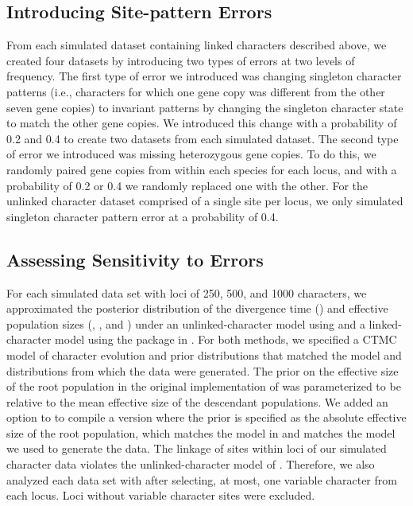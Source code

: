 \subsection{Introducing Site-pattern Errors}
From each simulated dataset containing linked characters described above, we 
created four datasets by 
introducing two types of errors at two levels of frequency. The first type of 
error we introduced was changing singleton character patterns (i.e., characters 
for which one gene copy was different from the other seven gene copies) to invariant 
patterns by changing the singleton character state to match the other gene 
copies. We introduced this change with a probability of 0.2 and 0.4 to create 
two datasets from each simulated dataset. The second type of error we introduced 
was missing heterozygous gene copies. To do this, we randomly paired gene copies 
from within each species for each locus, and with a probability 
of 0.2 or 0.4 we randomly replaced one with the other. For the unlinked character 
dataset comprised of a single site per locus, we only simulated singleton 
character pattern error at a probability of 0.4.

\subsection{Assessing Sensitivity to Errors}
For each simulated data set with loci of 250, 500, and 1000 characters, we
approximated the posterior distribution of the 
divergence time (\divtime) and effective population sizes (\rootpopsize, \tippopsize[1], and \tippopsize[2])
under an unlinked-character model using \ecoevolity
\citep[Version 0.3.2, Commit a7e9bf2;][]{Oaks2018ecoevolity}
and a linked-character model using the \beast
\citep[Version 0.15.1;][]{ogilvieStarBEAST2BringsFaster2017} package in \beastcore
\citep[Version 2.5.2;][]{bouckaertBEASTSoftwarePlatform2014}.
For both methods, we specified a CTMC model of character evolution and prior
distributions that matched the model and distributions from which the data were
generated. The prior on the effective size of the root population in the original
implementation of \ecoevolity was parameterized to be relative to the mean
effective size of the descendant populations.
We added an option to \ecoevolity to compile a version where the prior is
specified as the absolute effective size of the root population,
which matches the model in \beast and matches the model we used to generate the data.
The linkage of sites within loci of our simulated character data violates the 
unlinked-character model of \ecoevolity \citep{bryantInferringSpeciesTrees2012,Oaks2018ecoevolity}. Therefore, we also analyzed each data 
set with \ecoevolity after selecting, at most, one variable character from 
each locus. Loci without variable character sites were excluded. 

